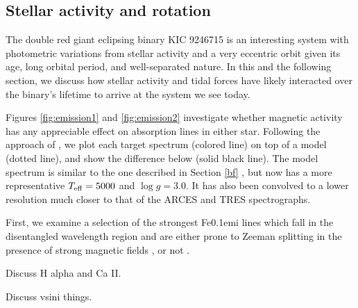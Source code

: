 \subsection{Stellar activity and rotation}\label{actrot}
The double red giant eclipsing binary KIC 9246715 is an interesting system with photometric variations from stellar activity and a very eccentric orbit given its age, long orbital period, and well-separated nature. In this and the following section, we discuss how stellar activity and tidal forces have likely interacted over the binary's lifetime to arrive at the system we see today.

Figures \ref{fig:emission1} and \ref{fig:emission2} investigate whether magnetic activity has any appreciable effect on absorption lines in either star. Following the approach of \citet{fro12}, we plot each target spectrum (colored line) on top of a model (dotted line), and show the difference below (solid black line). The model spectrum is similar to the one described in Section \ref{bf} \citep[PHOENIX BT-Settl, ][]{all03}, but now has a more representative $T_{\rm{eff}} = 5000$ and $\log g = 3.0$. It has also been convolved to a lower resolution much closer to that of the ARCES and TRES spectrographs.

First, we examine a selection of the strongest {\rm Fe}\kern 0.1em{\sc i} lines which fall in the disentangled wavelength region and are either prone to Zeeman splitting in the presence of strong magnetic fields \citep{har73}, or not \citep{sis70}. 

Discuss H alpha and Ca II.

Discuss vsini things.
  
  
  